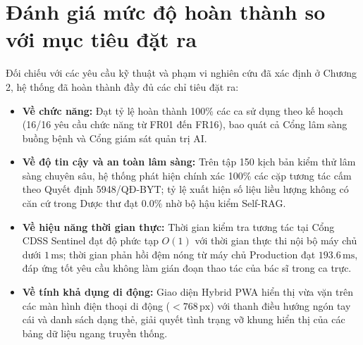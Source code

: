 \section{Đánh giá mức độ hoàn thành so với mục tiêu đặt ra}
\label{sec:objective_verification}

Đối chiếu với các yêu cầu kỹ thuật và phạm vi nghiên cứu đã xác định ở Chương 2, hệ thống đã hoàn thành đầy đủ các chỉ tiêu đặt ra:

\begin{itemize}[leftmargin=1.5em]
    \item \textbf{Về chức năng:} Đạt tỷ lệ hoàn thành 100\% các ca sử dụng theo kế hoạch (16/16 yêu cầu chức năng từ FR01 đến FR16), bao quát cả Cổng lâm sàng buồng bệnh và Cổng giám sát quản trị AI.
    \item \textbf{Về độ tin cậy và an toàn lâm sàng:} Trên tập 150 kịch bản kiểm thử lâm sàng chuyên sâu, hệ thống phát hiện chính xác 100\% các cặp tương tác cấm theo Quyết định 5948/QĐ-BYT; tỷ lệ xuất hiện số liệu liều lượng không có căn cứ trong Dược thư đạt $0.0\%$ nhờ bộ hậu kiểm Self-RAG.
    \item \textbf{Về hiệu năng thời gian thực:} Thời gian kiểm tra tương tác tại Cổng CDSS Sentinel đạt độ phức tạp $O(1)$ với thời gian thực thi nội bộ máy chủ dưới $1\,\text{ms}$; thời gian phản hồi đệm nóng từ máy chủ Production đạt $193.6\,\text{ms}$, đáp ứng tốt yêu cầu không làm gián đoạn thao tác của bác sĩ trong ca trực.
    \item \textbf{Về tính khả dụng di động:} Giao diện Hybrid PWA hiển thị vừa vặn trên các màn hình điện thoại di động ($< 768\,\text{px}$) với thanh điều hướng ngón tay cái và danh sách dạng thẻ, giải quyết tình trạng vỡ khung hiển thị của các bảng dữ liệu ngang truyền thống.
\end{itemize}
